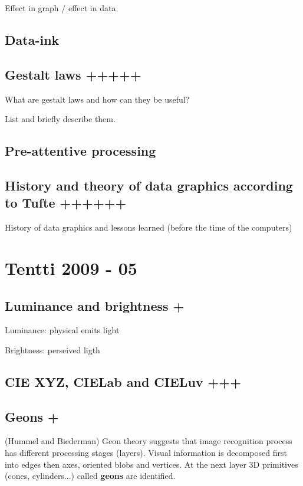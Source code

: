 \documentclass[a4paper]{article}
\begin{document}
Effect in graph / effect in data

\subsection{Data-ink}

\subsection{Gestalt laws +++++}

What are gestalt laws and how can they be useful?

List and briefly describe them.

\subsection{Pre-attentive processing}

\subsection{History and theory of data graphics according to Tufte ++++++}

History of data graphics and lessons learned (before the time of the computers)

\section{Tentti 2009 - 05}

\subsection{Luminance and brightness +}

Luminance: physical emits light

Brightness: perseived ligth

\subsection{CIE XYZ, CIELab and CIELuv +++}

\subsection{Geons +}

(Hummel and Biederman) Geon theory suggests that image recognition process has different processing stages (layers). Visual information is decomposed first into edges then axes, oriented blobs and vertices. At the next layer 3D primitives (cones, cylinders...) called \textbf{geons} are identified.
\end{document}
